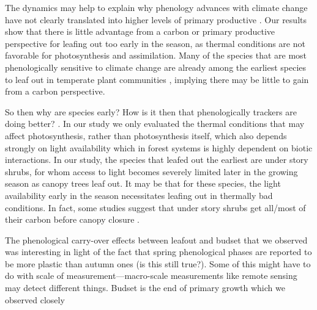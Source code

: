 \documentclass[12 pt]{article}
\begin{document}
The dynamics may help to explain why phenology advances with climate change have not clearly translated into higher levels of primary productive \citep{}. Our results show that there is little advantage from a carbon or primary productive perspective for leafing out too early in the season, as thermal conditions are not favorable for photosynthesis and assimilation. Many of the species that are most phenologically sensitive to climate change are already among the earliest species to leaf out in temperate plant communities \citep{}, implying there may be little to gain from a carbon perspective.

So then why are species early? How is it then that phenologically trackers are doing better? \citep{}. In our study we only evaluated the thermal conditions that may affect photosynthesis, rather than photosynthesis itself, which also depends strongly on light availability which in forest systems is highly dependent on biotic interactions. In our study, the species that leafed out the earliest are under story shrubs, for whom access to light becomes severely limited later in the growing season as canopy trees leaf out. It may be that for these species, the light availability early in the season necessitates leafing out in thermally bad conditions. In fact, some studies suggest that under story shrubs get all/most of their carbon before canopy closure \citep{}.

The phenological carry-over effects between leafout and budset that we observed was interesting in light of the fact that spring phenological phases are reported to be more plastic than autumn ones (is this still true?). Some of this might have to do with scale of measurement---macro-scale measurements like remote sensing may detect different things. Budset is the end of primary growth which we observed closely   
\end{document}
